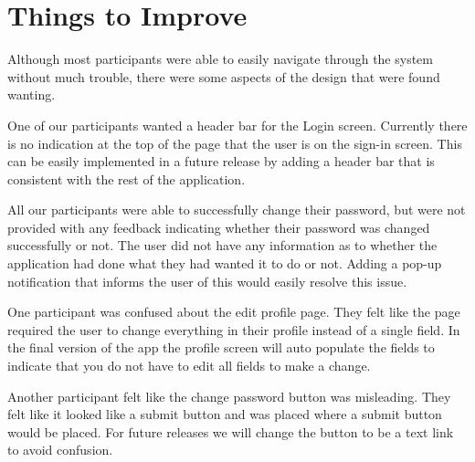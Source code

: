 \documentclass[12pt,letterpaper]{article}
\begin{document}
\section{Things to Improve}
Although most participants were able to easily navigate through the system without much trouble, there were some aspects of the design that were found wanting.\par
One of our participants wanted a header bar for the Login screen. Currently there is no indication at the top of the page that the user is on the sign-in screen. This can be easily implemented in a future release by adding a header bar that is consistent with the rest of the application.\par
All our participants were able to successfully change their password, but were not provided with any feedback indicating whether their password was changed successfully or not. The user did not have any information as to whether the application had done what they had wanted it to do or not. Adding a pop-up notification that informs the user of this would easily resolve this issue.\par
 	One participant was confused about the edit profile page. They felt like the page required the user to change everything in their profile instead of a single field. In the final version of the app the profile screen will auto populate the fields to indicate that you do not have to edit all fields to make a change.\par
	Another participant felt like the change password button was misleading. They felt like it looked like a submit button and was placed where a submit button would be placed. For future releases we will change the button to be a text link to avoid confusion.\par


\clearpage
\end{document}
